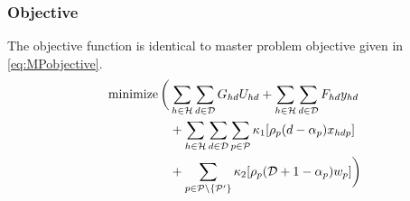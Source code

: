     \subsubsection*{Objective}
    The objective function is identical to master problem objective given in \ref{eq:MPobjective}.
    \begin{align}
    \operatorname{minimize} \bigg( &\sum\limits_{h \in \mathcal{H}} \sum\limits_{d \in \mathcal{D}} G_{hd} U_{hd} 
     + \sum\limits_{h \in \mathcal{H}}\sum\limits_{d \in \mathcal{D}} F_{hd} y_{hd}
    \\ &+ \sum\limits_{h \in \mathcal{H}} \sum\limits_{d \in \mathcal{D}} \sum\limits_{p \in \mathcal{P}}  \label{MP:objective}
    \kappa_{1} [\rho_{p} (d - \alpha_{p}) x_{hdp}]
    \\ &+ \sum\limits_{p \in \mathcal{P} \setminus \lbrace \mathcal{P}{'} \rbrace } \kappa_{2} [\rho_{p}( \mathcal{D} + 1 -\alpha_{p} ) w_{p}]
    \bigg) \notag
    \end{align}
    
